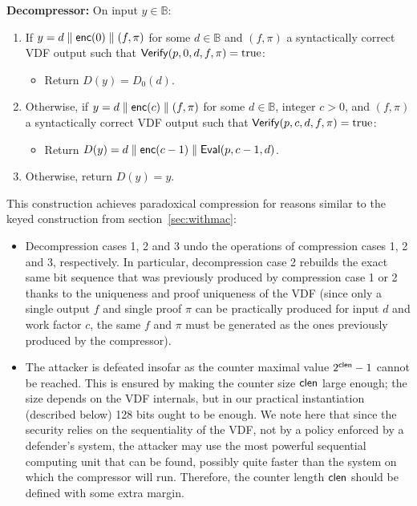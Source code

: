 \documentclass{llncs}
\newcommand{\bB}{\mathbb{B}}
\newcommand{\cc}{\text{\textsf{enc}}}
\newcommand{\cclen}{\text{\textsf{clen}}}
\newcommand{\Eval}{\text{\textsf{Eval}}}
\newcommand{\Verify}{\text{\textsf{Verify}}}
\begin{document}
{\begin{minipage}{\textwidth - 8.2pt}
\noindent\textsf{\textbf{Decompressor:}} On input $y \in \bB$:
\begin{enumerate}
    \item If $y = d \parallel \cc(0) \parallel (f, \pi)$ for some $d \in
    \bB$ and $(f, \pi)$ a syntactically correct VDF output such that
    $\Verify(p, 0, d, f, \pi) = \text{true}$:
    \begin{itemize}
        \item Return $D(y) = D_0(d)$.
    \end{itemize}

    \item Otherwise, if $y = d \parallel \cc(c) \parallel (f, \pi)$ for
    some $d \in \bB$, integer $c > 0$, and $(f, \pi)$ a syntactically
    correct VDF output such that $\Verify(p, c, d, f, \pi) =
    \text{true}$:
    \begin{itemize}
        \item Return $D(y) = d \parallel \cc(c-1) \parallel \Eval(p, c - 1, d)$.
    \end{itemize}

    \item Otherwise, return $D(y) = y$.
\end{enumerate}

\end{minipage}}
\vspace{2ex}

This construction achieves paradoxical compression for reasons similar
to the keyed construction from section~\ref{sec:withmac}:
\begin{itemize}

    \item Decompression cases 1, 2 and 3 undo the operations of
    compression cases 1, 2 and 3, respectively. In particular,
    decompression case 2 rebuilds the exact same bit sequence that was
    previously produced by compression case 1 or 2 thanks to the
    uniqueness and proof uniqueness of the VDF (since only a single
    output $f$ and single proof $\pi$ can be practically produced for
    input $d$ and work factor $c$, the same $f$ and $\pi$ must be
    generated as the ones previously produced by the compressor).

    \item The attacker is defeated insofar as the counter maximal value
    $2^{\cclen} - 1$ cannot be reached. This is ensured by making the
    counter size $\cclen$ large enough; the size depends on the VDF
    internals, but in our practical instantiation (described below) 128
    bits ought to be enough. We note here that since the security relies
    on the sequentiality of the VDF, not by a policy enforced by a
    defender's system, the attacker may use the most powerful sequential
    computing unit that can be found, possibly quite faster than the
    system on which the compressor will run. Therefore, the counter
    length $\cclen$ should be defined with some extra margin.

\end{itemize}
\end{document}
